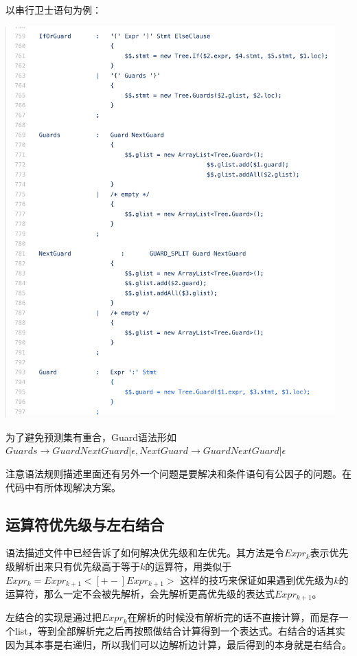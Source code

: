 \documentclass{article}
\theoremstyle{plain}
\theoremstyle{definition}
\begin{document}
    以串行卫士语句为例：

    \includegraphics[width=5in]{guard.png}

    为了避免预测集有重合，Guard语法形如$Guards \to Guard NextGuard | \epsilon, NextGuard \to Guard NextGuard | \epsilon$

    注意语法规则描述里面还有另外一个问题是要解决和条件语句有公因子的问题。在代码中有所体现解决方案。

    \subsection{运算符优先级与左右结合}

    语法描述文件中已经告诉了如何解决优先级和左优先。其方法是令$Expr_k$表示优先级解析出来只有优先级高于等于$k$的运算符，用类似于$Expr_k = Expr_{k+1} <[+-] Expr_{k+1}>$ 这样的技巧来保证如果遇到优先级为$k$的运算符，那么一定不会被先解析，会先解析更高优先级的表达式$Expr_{k+1}$。

    左结合的实现是通过把$Expr_k$在解析的时候没有解析完的话不直接计算，而是存一个list，等到全部解析完之后再按照做结合计算得到一个表达式。右结合的话其实因为其本事是右递归，所以我们可以边解析边计算，最后得到的本身就是右结合。
\end{document}
